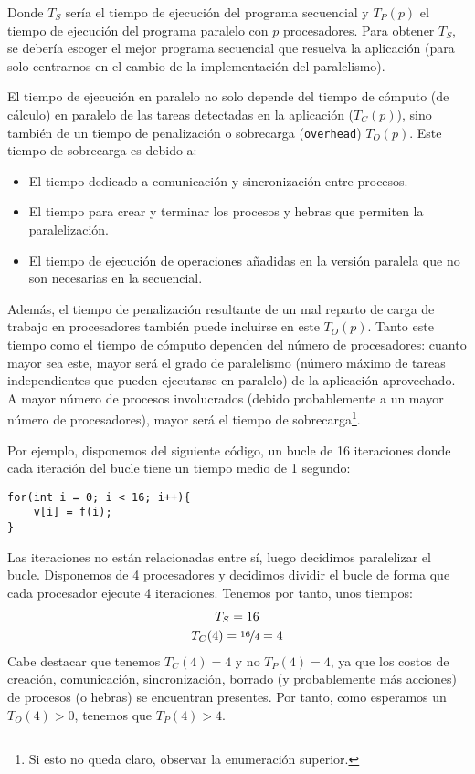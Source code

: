 Donde $T_S$ sería el tiempo de ejecución del programa secuencial y $T_P(p)$ el tiempo de ejecución del programa paralelo con $p$ procesadores. Para obtener $T_S$, se debería escoger el mejor programa secuencial que resuelva la aplicación (para solo centrarnos en el cambio de la implementación del paralelismo).

El tiempo de ejecución en paralelo no solo depende del tiempo de cómputo (de cálculo) en paralelo de las tareas detectadas en la aplicación ($T_C(p)$), sino también de un tiempo de penalización o sobrecarga (\verb|overhead|) $T_O(p)$. Este tiempo de sobrecarga es debido a:
\begin{itemize}
    \item El tiempo dedicado a comunicación y sincronización entre procesos.
    \item El tiempo para crear y terminar los procesos y hebras que permiten la paralelización.
    \item El tiempo de ejecución de operaciones añadidas en la versión paralela que no son necesarias en la secuencial.
\end{itemize}
Además, el tiempo de penalización resultante de un mal reparto de carga de trabajo en procesadores también puede incluirse en este $T_O(p)$.
Tanto este tiempo como el tiempo de cómputo dependen del número de procesadores: cuanto mayor sea este, mayor será el grado de paralelismo (número máximo de tareas independientes que pueden ejecutarse en paralelo) de la aplicación aprovechado. A mayor número de procesos involucrados (debido probablemente a un mayor número de procesadores), mayor será el tiempo de sobrecarga\footnote{Si esto no queda claro, observar la enumeración superior.}.

\begin{ejemplo}
    Por ejemplo, disponemos del siguiente código, un bucle de 16 iteraciones donde cada iteración del bucle tiene un tiempo medio de 1 segundo:
    \begin{verbatim}
for(int i = 0; i < 16; i++){
    v[i] = f(i);
}
    \end{verbatim}
    Las iteraciones no están relacionadas entre sí, luego decidimos paralelizar el bucle. Disponemos de 4 procesadores y decidimos dividir el bucle de forma que cada procesador ejecute 4 iteraciones. Tenemos por tanto, unos tiempos:
    \begin{gather*}
        T_S = 16 \\
        T_C(4) = \nicefrac{16}{4} = 4
    \end{gather*}
    Cabe destacar que tenemos $T_C(4)=4$ y no $T_P(4)=4$, ya que los costos de creación, comunicación, sincronización, borrado (y probablemente más acciones) de procesos (o hebras) se encuentran presentes. Por tanto, como esperamos un $T_O(4) > 0$, tenemos que $T_P(4) > 4$.
\end{ejemplo}

